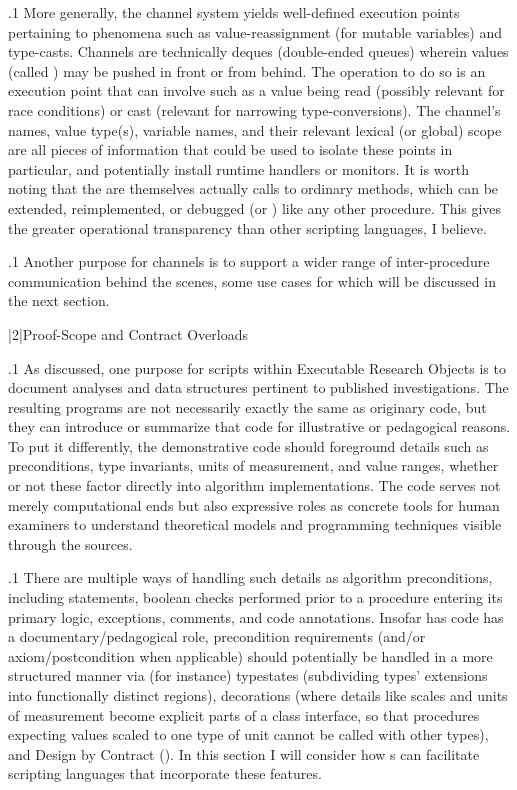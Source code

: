 \documentclass[11pt, twocolumn]{article}
\begin{document}
\p.1{%
More generally, the channel system yields well-defined execution
points pertaining to phenomena such as value-reassignment
(for mutable variables) and type-casts. Channels are
technically deques (double-ended queues) wherein values
(called ) may be pushed in front or from behind.
The operation to do so is an execution point that
can involve  such as a value being read
(possibly relevant for race conditions) or cast
(relevant for narrowing type-conversions). The channel's
names, value type(s), variable names, and their
relevant lexical (or global) scope are all pieces of
information that could be used to isolate these
points in particular, and potentially install runtime
handlers or monitors. It is worth noting that the
  are themselves actually calls
to ordinary  methods, which can be extended, reimplemented,
or debugged (or ) like any other
 procedure. This gives the  greater operational transparency
than other scripting languages, I believe. \vspace{1em}
}%

\p.1{%
Another purpose for channels is to support a wider range of
inter-procedure communication behind the scenes,
some use cases for which will be discussed in the next section.
}%


\s|2|{Proof-Scope and Contract Overloads}

\p.1{%
As discussed, one purpose for scripts within Executable Research Objects
is to document analyses and data structures pertinent to
published investigations. The resulting programs are not necessarily
exactly the same as originary code, but they can introduce or
summarize that code for illustrative or pedagogical reasons.
To put it differently, the demonstrative code should foreground
details such as preconditions, type invariants,
units of measurement, and value ranges, whether or not
these factor directly into algorithm implementations.
The code serves not merely computational ends but
also expressive roles as concrete tools for human
examiners to understand theoretical models and programming
techniques visible through the sources.
}%

\p.1{%
There are multiple ways of handling such details as
algorithm preconditions, including  statements,
boolean checks performed prior to a procedure entering
its primary logic, exceptions, comments, and code
annotations. Insofar has code has a documentary/pedagogical
role, precondition requirements (and/or axiom/postcondition when applicable)
should potentially be handled in a more structured manner
via (for instance) typestates (subdividing types' extensions
into functionally distinct regions), decorations
(where details like scales and units of measurement
become explicit parts of a class interface, so that
procedures expecting values scaled to one type of
unit cannot be called with other types), and
Design by Contract (). In this section I will
consider how s can facilitate scripting languages
that incorporate these features.
}%
\end{document}
